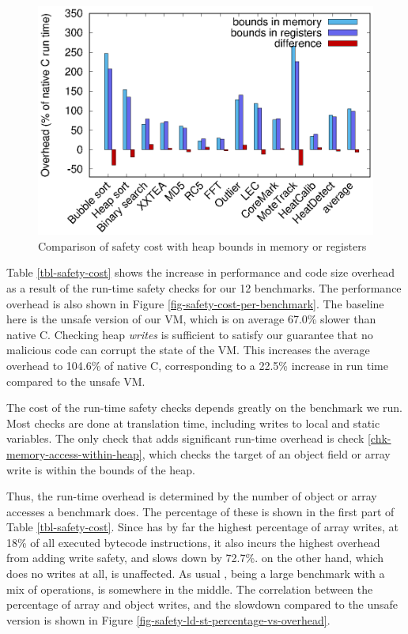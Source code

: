 \begin{figure}
\centering
\includegraphics[width=\mygraphsize]{safety-cost-diff-using-regs.eps}
\caption{Comparison of safety cost with heap bounds in memory or registers}
\label{fig-safety-cost-memory-or-registers}
\end{figure}

Table \ref{tbl-safety-cost} shows the increase in performance and code size overhead as a result of the run-time safety checks for our 12 benchmarks. The performance overhead is also shown in Figure \ref{fig-safety-cost-per-benchmark}. The baseline here is the unsafe version of our VM, which is on average 67.0\% slower than native C. Checking heap \emph{writes} is sufficient to satisfy our guarantee that no malicious code can corrupt the state of the VM. This increases the average overhead to 104.6\% of native C, corresponding to a 22.5\% increase in run time compared to the unsafe VM.

The cost of the run-time safety checks depends greatly on the benchmark we run. Most checks are done at translation time, including writes to local and static variables. The only check that adds significant run-time overhead is check \ref{chk-memory-access-within-heap}, which checks the target of an object field or array write is within the bounds of the heap.

Thus, the run-time overhead is determined by the number of object or array accesses a benchmark does. The percentage of these is shown in the first part of Table \ref{tbl-safety-cost}. Since  has by far the highest percentage of array writes, at 18\% of all executed bytecode instructions, it also incurs the highest overhead from adding write safety, and slows down by 72.7\%.  on the other hand, which does no writes at all, is unaffected. As usual , being a large benchmark with a mix of operations, is somewhere in the middle. The correlation between the percentage of array and object writes, and the slowdown compared to the unsafe version is shown in Figure \ref{fig-safety-ld-st-percentage-vs-overhead}.

